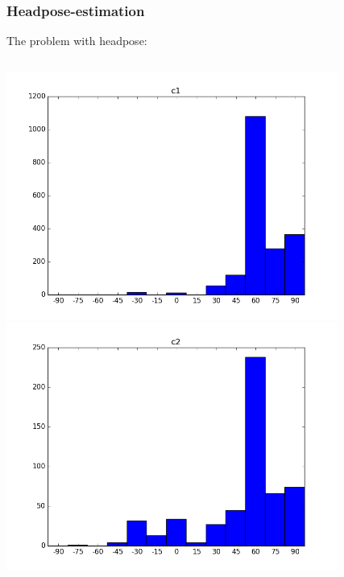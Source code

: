 \documentclass{beamer}
\begin{document}
	\begin{frame}
		\frametitle{Headpose-estimation}
		The problem with headpose:
		\begin{columns}
		 	\begin{column}{0.5\textwidth}
		 		\begin{center}
		 			\includegraphics[width=0.85\textwidth]{headpose_evaluation_c1}\\
		 			\includegraphics[width=0.85\textwidth]{headpose_evaluation_c2}
		 		\end{center}
		 	\end{column}
		 	\begin{column}{0.5\textwidth}
		 		\begin{center}

\end{center}
\end{column}
\end{columns}
\end{frame}
\end{document}
